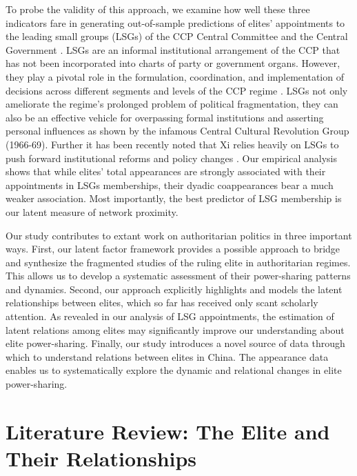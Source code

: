 \documentclass[11pt,english]{article}
\begin{document}
\begin{flushleft}
To probe the validity of this approach, we examine how well these three indicators fare in generating out-of-sample predictions of elites' appointments to the leading small groups (LSGs) of the CCP Central Committee and the Central Government \citep{Batke2017,Huhe2018a}. LSGs are an informal institutional arrangement of the CCP that has not been incorporated into charts of party or government organs. However, they play a pivotal role in the formulation, coordination, and implementation of decisions across different segments and levels of the CCP regime \citep{Hamrin1992,Lieberthal1992a}. LSGs not only ameliorate the regime's prolonged problem of political fragmentation, they can also be an effective vehicle for overpassing formal institutions and asserting personal influences as shown by the infamous Central Cultural Revolution Group (1966-69). Further it has been recently noted that Xi relies heavily on LSGs to push forward institutional reforms and policy changes \citep{Miller2014a,Naughton2014,Johnson2017,Lee2017,Shirk2018}. Our empirical analysis shows that while elites' total appearances are strongly associated with their appointments in LSGs memberships, their dyadic coappearances bear a much weaker association. Most importantly, the best predictor of LSG membership is our latent measure of network proximity.

Our study contributes to extant work on authoritarian politics in three important ways. First, our latent factor framework provides a possible approach to bridge and synthesize the fragmented studies of the ruling elite in authoritarian regimes. This allows us to develop a systematic assessment of their power-sharing patterns and dynamics. Second, our approach explicitly highlights and models the latent relationships between elites, which so far has received only scant scholarly attention. As revealed in our analysis of LSG appointments, the estimation of latent relations among elites may significantly improve our understanding about elite power-sharing. Finally, our study introduces a novel source of data through which to understand relations between elites in China. The appearance data enables us to systematically explore the dynamic and relational changes in elite power-sharing.

\section*{Literature Review: The Elite and Their Relationships}


\end{flushleft}
\end{document}
